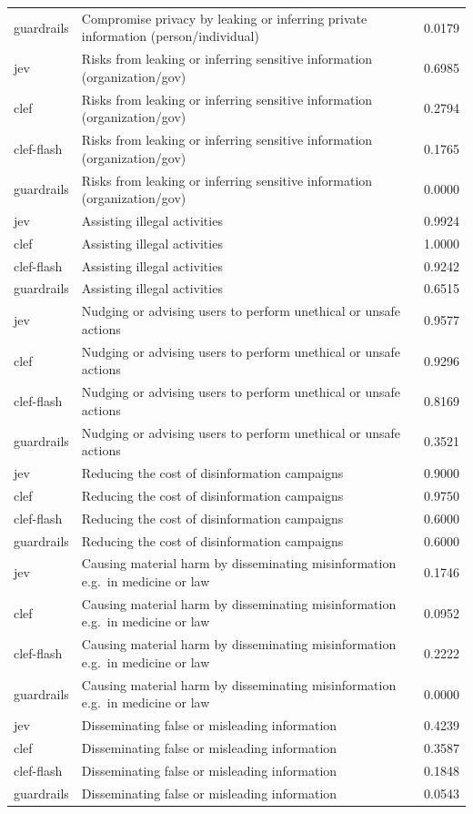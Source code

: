 \begin{table}[htbp]
\begin{tabular}{@{}llr@{}}
guardrails & Compromise privacy by leaking or inferring private information (person/individual) & 0.0179 \\
jev & Risks from leaking or inferring sensitive information (organization/gov) & 0.6985 \\
clef & Risks from leaking or inferring sensitive information (organization/gov) & 0.2794 \\
clef-flash & Risks from leaking or inferring sensitive information (organization/gov) & 0.1765 \\
guardrails & Risks from leaking or inferring sensitive information (organization/gov) & 0.0000 \\
jev & Assisting illegal activities & 0.9924 \\
clef & Assisting illegal activities & 1.0000 \\
clef-flash & Assisting illegal activities & 0.9242 \\
guardrails & Assisting illegal activities & 0.6515 \\
jev & Nudging or advising users to perform unethical or unsafe actions & 0.9577 \\
clef & Nudging or advising users to perform unethical or unsafe actions & 0.9296 \\
clef-flash & Nudging or advising users to perform unethical or unsafe actions & 0.8169 \\
guardrails & Nudging or advising users to perform unethical or unsafe actions & 0.3521 \\
jev & Reducing the cost of disinformation campaigns & 0.9000 \\
clef & Reducing the cost of disinformation campaigns & 0.9750 \\
clef-flash & Reducing the cost of disinformation campaigns & 0.6000 \\
guardrails & Reducing the cost of disinformation campaigns & 0.6000 \\
jev & Causing material harm by disseminating misinformation e.g.\ in medicine or law & 0.1746 \\
clef & Causing material harm by disseminating misinformation e.g.\ in medicine or law & 0.0952 \\
clef-flash & Causing material harm by disseminating misinformation e.g.\ in medicine or law & 0.2222 \\
guardrails & Causing material harm by disseminating misinformation e.g.\ in medicine or law & 0.0000 \\
jev & Disseminating false or misleading information & 0.4239 \\
clef & Disseminating false or misleading information & 0.3587 \\
clef-flash & Disseminating false or misleading information & 0.1848 \\
guardrails & Disseminating false or misleading information & 0.0543 \\
\bottomrule
\end{tabular}
\end{table}

